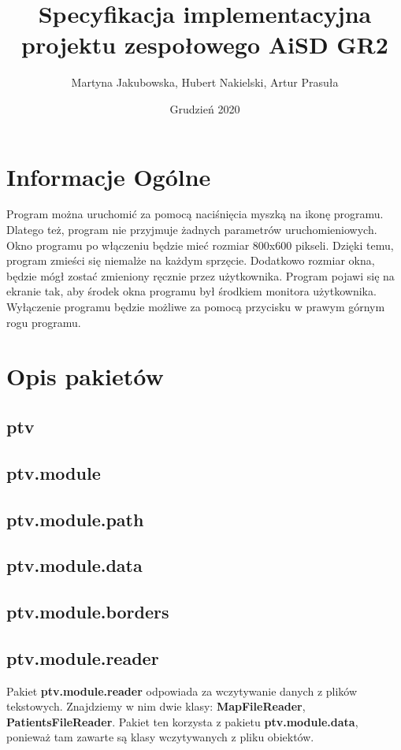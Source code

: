 \documentclass[]{article}
\title{Specyfikacja implementacyjna projektu zespołowego \textbf{AiSD GR2}}
\author{Martyna Jakubowska, Hubert Nakielski, Artur Prasuła}
\date{Grudzień 2020}
\begin{document}
    \maketitle
    
    \section{Informacje Ogólne}
    Program można uruchomić za pomocą naciśnięcia myszką na ikonę programu.
    Dlatego też, program nie przyjmuje żadnych parametrów uruchomieniowych.
    Okno programu po włączeniu będzie mieć rozmiar 800x600 pikseli.
    Dzięki temu, program zmieści się niemalże na każdym sprzęcie.
    Dodatkowo rozmiar okna, będzie mógł zostać zmieniony ręcznie przez użytkownika.
    Program pojawi się na ekranie tak, aby środek okna programu był środkiem monitora użytkownika.
    Wyłączenie programu będzie możliwe za pomocą przycisku w prawym górnym rogu programu.
    
    
    \section{Opis pakietów}
        \subsection{ptv}
        \subsection{ptv.module}
        \subsection{ptv.module.path} %
        \subsection{ptv.module.data} %
        \subsection{ptv.module.borders} %
		
        \subsection{ptv.module.reader}
            Pakiet \textbf{ptv.module.reader} odpowiada za wczytywanie danych z plików tekstowych.
            Znajdziemy w nim dwie klasy: \textbf{MapFileReader}, \textbf{PatientsFileReader}.
            Pakiet ten korzysta z pakietu \textbf{ptv.module.data}, ponieważ tam zawarte są klasy wczytywanych z pliku obiektów.
        
\end{document}
